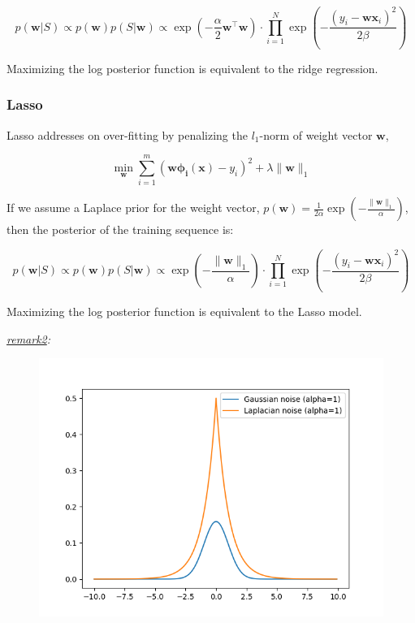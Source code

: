 \documentclass{article}
\begin{document}
	\begin{equation}
	p(\mathbf{w}|S) \propto p(\mathbf{w}) p(S|\mathbf{w}) \propto \exp \left( -\frac{\alpha}{2} \mathbf{w}^\top \mathbf{w} \right) \cdot \prod_{i=1}^N \exp \left( -\frac{(y_i-\mathbf{wx}_i)^2}{2\beta} \right) 
	\end{equation}
	
Maximizing the log posterior function is equivalent to the ridge regression.
	
	
\subsubsection{Lasso}

	Lasso addresses on over-fitting by penalizing the $l_1$-norm of weight vector $\mathbf{w}$,
		
	\begin{equation*}
	\min_\mathbf{w} \sum_{i=1}^m (\mathbf{w\phi_i(x)} - y_i)^2 + \lambda\|\mathbf{w}\|_1
	\end{equation*}
	
	If we assume a Laplace prior for the weight vector, $p(\mathbf{w})=\frac{1}{2\alpha} \exp \left( -\frac{\|\mathbf{w}\|_1}{\alpha} \right)$, then the posterior of the training sequence is:
	
	\begin{equation}
	p(\mathbf{w}|S) \propto p(\mathbf{w}) p(S|\mathbf{w}) \propto \exp \left( -\frac{\|\mathbf{w}\|_1}{\alpha} \right) \cdot \prod_{i=1}^N \exp \left( -\frac{(y_i-\mathbf{wx}_i)^2}{2\beta} \right)
	\end{equation}

Maximizing the log posterior function is equivalent to the Lasso model.

	\textit{\underline{remark2}: }
	\begin{figure}[!htbp]
	\begin{center}
	\includegraphics[scale=.4]{C4-1.png}	
	\end{center}
	\end{figure}
\end{document}
